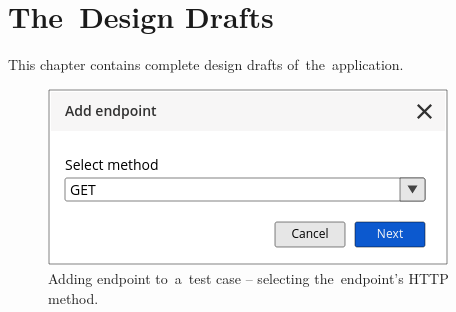 





\chapter{The~Design Drafts}
\label{drafts}
This chapter contains complete design drafts of~the~application.

\begin{figure}[!hbt]
	\centering
	\includegraphics[scale=0.7]{./designs/addTest1.png}
	\caption{Adding endpoint to~a~test case -- selecting the~endpoint's HTTP
	method.}
	\label{figAddTest1}
\end{figure}

